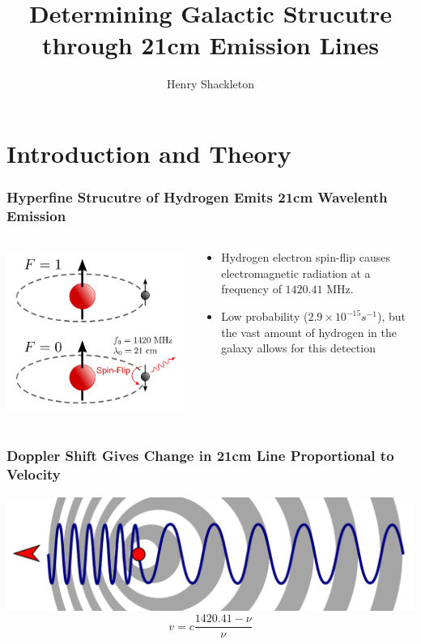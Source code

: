\documentclass{beamer}
\title[21 cm]{Determining Galactic Strucutre through 21cm Emission Lines}
\author{Henry Shackleton}
\begin{document}
\titlepage

\section{Introduction and Theory}

\begin{frame}
  \frametitle{Hyperfine Strucutre of Hydrogen Emits 21cm Wavelenth Emission}
  \begin{columns}
    \begin{column}{0.7\textwidth}
      \begin{center}
  \includegraphics[width=0.7\linewidth]{hyperfine}
\end{center}
\end{column}
\begin{column}{0.3\textwidth}
  \begin{center}
    \begin{itemize}
      \item Hydrogen electron spin-flip causes electromagnetic radiation at a frequency of $1420.41$ MHz.
      \item Low probability ($2.9 \times 10^{-15} s^{-1}$), but the vast amount of hydrogen in the galaxy allows for this detection
    \end{itemize}\end{center}\end{column}\end{columns}
\end{frame}

\begin{frame}
  \frametitle{Doppler Shift Gives Change in 21cm Line Proportional to Velocity}
  \includegraphics[width=1\textwidth]{diagrammatic}
  \begin{equation*}
  v = c \frac{1420.41 - \nu}{\nu}
\end{equation*}
\end{frame}
\end{document}
